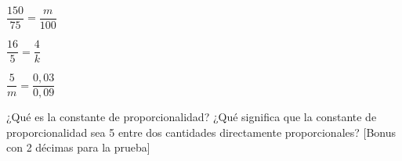 \documentclass[sin curso]{plantilla-evaluacion-v1}
\begin{document}
\begin{partes}
\begin{ejercicios}
\begin{tcbraster}[raster columns=2, raster column skip=4pt,raster width=.6\linewidth]
\begin{caja}[height=35pt,title=CP]
      \end{caja}
    \end{tcbraster}
    \ejercicio $\dfrac{150}{75} = \dfrac{m}{100}$
    \vspace*{30pt}
    \begin{tcbraster}[raster columns=2, raster column skip=4pt,raster width=.6\linewidth]
      \begin{caja}[height=35pt,title=$m$]
      \end{caja}
      \begin{caja}[height=35pt,title=CP]
      \end{caja}
    \end{tcbraster}
    \ejercicio $\dfrac{16}{5} = \dfrac{4}{k}$
    \vspace*{30pt}
    \begin{tcbraster}[raster columns=2, raster column skip=4pt,raster width=.6\linewidth]
      \begin{caja}[height=35pt,title=$k$]
      \end{caja}
      \begin{caja}[height=35pt,title=CP]
      \end{caja}
    \end{tcbraster}
    \ejercicio $\dfrac{5}{m} = \dfrac{0,03}{0,09}$
    \vspace*{30pt}
    \begin{tcbraster}[raster columns=2, raster column skip=4pt,raster width=.6\linewidth]
      \begin{caja}[height=35pt,title=$m$]
      \end{caja}
      \begin{caja}[height=35pt,title=CP]
      \end{caja}
    \end{tcbraster}
  \end{ejercicios}
\parte ¿Qué es la constante de proporcionalidad? ¿Qué significa que la constante 
de proporcionalidad sea 5 entre dos cantidades directamente proporcionales?
\hfill[Bonus con 2 décimas para la prueba]
\begin{respuesta}[height=5 cm]
\end{respuesta}
\end{partes}
\end{document}
